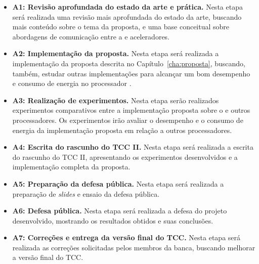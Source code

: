 \begin{itemize}
    \item \textbf{A1: Revisão aprofundada do estado da arte e prática.} Nesta etapa será
        realizada uma revisão mais aprofundada do estado da arte, buscando mais
        conteúdo sobre o tema da proposta, e uma base conceitual sobre abordagens de
        comunicação entre a \cpu e aceleradores.
    \item \textbf{A2: Implementação da proposta.} Nesta etapa será realizada a
        implementação da proposta descrita no Capítulo~\ref{cha:proposta},
        buscando, também, estudar outras implementações para alcançar um bom
        desempenho e consumo de energia no processador \mppa.
    \item \textbf{A3: Realização de experimentos.} Nesta etapa serão realizados
        experimentos comparativos entre a implementação proposta sobre o \mppa e
        outros processadores. Os experimentos irão avaliar o desempenho e o consumo de
        energia da implementação proposta em relação a outros processadores.
    \item \textbf{A4: Escrita do rascunho do TCC II.} Nesta etapa será realizada
        a escrita do rascunho do TCC II, apresentando os experimentos desenvolvidos e a
        implementação completa da proposta.
    \item \textbf{A5: Preparação da defesa pública.} Nesta etapa será realizada
        a preparação de \textit{slides} e ensaio da defesa pública.
    \item \textbf{A6: Defesa pública.} Nesta etapa será realizada a defesa do
        projeto desenvolvido, mostrando os resultados obtidos e suas conclusões.
    \item \textbf{A7: Correções e entrega da versão final do TCC.} Nesta etapa
        será realizada as correções solicitadas pelos membros da banca, buscando
        melhorar a versão final do TCC.
\end{itemize}

